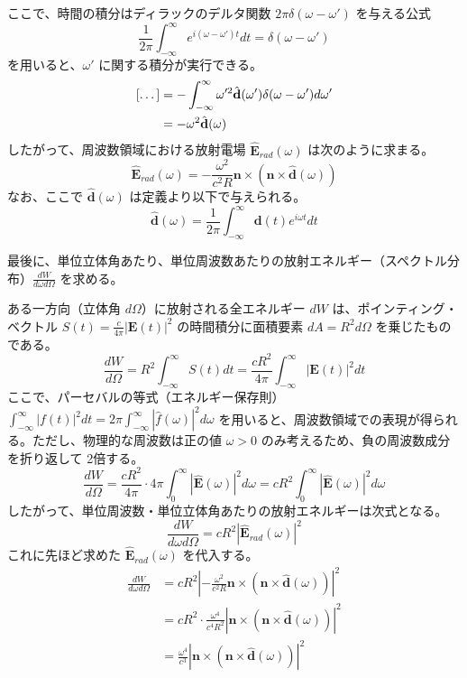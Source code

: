 \documentclass[a4paper,11pt]{bxjsarticle} %
\begin{document}
ここで、時間の積分はディラックのデルタ関数 $2\pi \delta(\omega - \omega')$ を与える公式
\begin{equation}
    \frac{1}{2\pi} \int_{-\infty}^{\infty} e^{i(\omega - \omega')t} dt = \delta(\omega - \omega')
\end{equation}
を用いると、$\omega'$ に関する積分が実行できる。
\begin{align}
    \left[ \dots \right] &= - \int_{-\infty}^{\infty} \omega'^2 \hat{\mathbf{d}}(\omega') \delta(\omega - \omega') d\omega' \notag \\
    &= - \omega^2 \hat{\mathbf{d}}(\omega)
\end{align}
したがって、周波数領域における放射電場 $\hat{\mathbf{E}}_{rad}(\omega)$ は次のように求まる。
\begin{equation}
    \hat{\mathbf{E}}_{rad}(\omega) = - \frac{\omega^2}{c^2 R} \mathbf{n} \times (\mathbf{n} \times \hat{\mathbf{d}}(\omega))
\end{equation}
なお、ここで $\hat{\mathbf{d}}(\omega)$ は定義より以下で与えられる。
\begin{equation}
    \hat{\mathbf{d}}(\omega) = \frac{1}{2\pi} \int_{-\infty}^{\infty} \mathbf{d}(t) e^{i\omega t} dt
\end{equation}

最後に、単位立体角あたり、単位周波数あたりの放射エネルギー（スペクトル分布）$\frac{dW}{d\omega d\Omega}$ を求める。


ある一方向（立体角 $d\Omega$）に放射される全エネルギー $d W$ は、ポインティング・ベクトル $S(t) = \frac{c}{4\pi}|\bm{E}(t)|^2$ の時間積分に面積要素 $dA = R^2 d\Omega$ を乗じたものである。
\begin{equation}
    \frac{dW}{d\Omega} = R^2 \int_{-\infty}^{\infty} S(t) dt = \frac{c R^2}{4\pi} \int_{-\infty}^{\infty} |\bm{E}(t)|^2 dt
\end{equation}
ここで、パーセバルの等式（エネルギー保存則） $\int_{-\infty}^{\infty} |f(t)|^2 dt = 2\pi \int_{-\infty}^{\infty} |\hat{f}(\omega)|^2 d\omega$ を用いると、周波数領域での表現が得られる。ただし、物理的な周波数は正の値 $\omega > 0$ のみ考えるため、負の周波数成分を折り返して 2倍する。
\begin{equation}
    \frac{dW}{d\Omega} = \frac{c R^2}{4\pi} \cdot 4\pi \int_{0}^{\infty} |\hat{\bm{E}}(\omega)|^2 d\omega = c R^2 \int_{0}^{\infty} |\hat{\bm{E}}(\omega)|^2 d\omega
\end{equation}
したがって、単位周波数・単位立体角あたりの放射エネルギーは次式となる。
\begin{equation}
    \frac{dW}{d\omega d\Omega} = c R^2 |\hat{\mathbf{E}}_{rad}(\omega)|^2
\end{equation}
これに先ほど求めた $\hat{\mathbf{E}}_{rad}(\omega)$ を代入する。
\begin{align}
    \frac{dW}{d\omega d\Omega} &= c R^2 \left| - \frac{\omega^2}{c^2 R} \mathbf{n} \times (\mathbf{n} \times \hat{\mathbf{d}}(\omega)) \right|^2 \\
    &= c R^2 \cdot \frac{\omega^4}{c^4 R^2} \left| \mathbf{n} \times (\mathbf{n} \times \hat{\mathbf{d}}(\omega)) \right|^2 \\
    &= \frac{\omega^4}{c^3} \left| \mathbf{n} \times (\mathbf{n} \times \hat{\mathbf{d}}(\omega)) \right|^2
\end{align}
\end{document}
